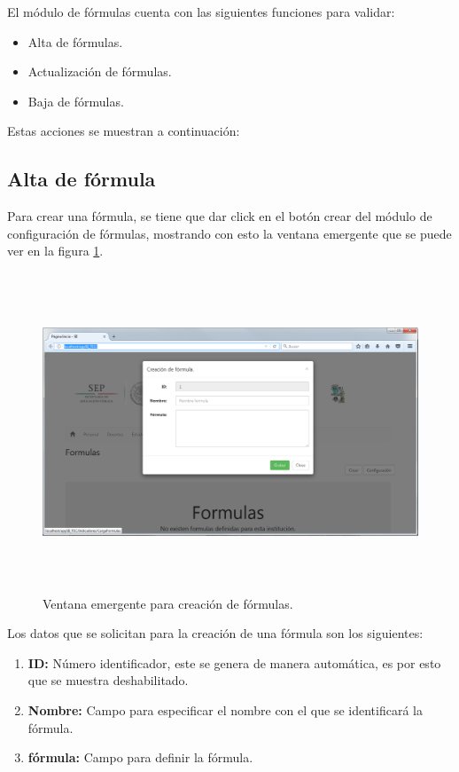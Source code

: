 			El m\'odulo de f\'ormulas cuenta con las siguientes funciones para validar:
			\begin{itemize}
				\item Alta de f\'ormulas.
				\item Actualizaci\'on de f\'ormulas.
				\item Baja de f\'ormulas.
			\end{itemize}

			Estas acciones se muestran a continuaci\'on:

			\subsection{Alta de f\'ormula}

			Para crear una f\'ormula, se tiene que dar click en el bot\'on crear del m\'odulo de configuraci\'on de f\'ormulas, mostrando con esto la ventana emergente  que se puede ver en la figura \ref{fig_FormulasCrear}.\\

			\begin{figure}[]
		        \centering
		        \includegraphics[width=16cm, height=9.5cm]{figuras/FormulasCrear}
		        \caption{Ventana emergente para creaci\'on de f\'ormulas.}
		        \label{fig_FormulasCrear}
		    \end{figure}
			
			Los datos que se solicitan para la creaci\'on de una f\'ormula son los siguientes:
			\begin{enumerate}[1.]
				\item \textbf{ID:} N\'umero identificador, este se genera de manera autom\'atica, es por esto que se muestra deshabilitado.
				\item \textbf{Nombre:} Campo para especificar el nombre con el que se identificar\'a la f\'ormula.
				\item \textbf{f\'ormula:} Campo para definir la f\'ormula.
			\end{enumerate}

